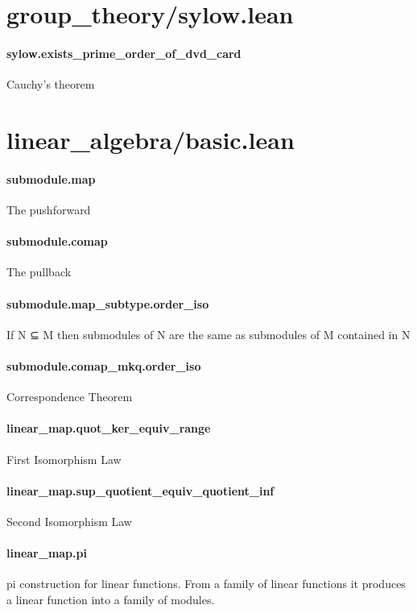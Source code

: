 \documentclass{article}
\begin{document}
\section{group\_theory/sylow.lean}\paragraph{sylow.exists\_prime\_order\_of\_dvd\_card}
\par
Cauchy's theorem
\section{linear\_algebra/basic.lean}\paragraph{submodule.map}
\par
The pushforward
\paragraph{submodule.comap}
\par
The pullback
\paragraph{submodule.map\_subtype.order\_iso}
\par
If N ⊆ M then submodules of N are the same as submodules of M contained in N
\paragraph{submodule.comap\_mkq.order\_iso}
\par
Correspondence Theorem
\paragraph{linear\_map.quot\_ker\_equiv\_range}
\par
First Isomorphism Law
\paragraph{linear\_map.sup\_quotient\_equiv\_quotient\_inf}
\par
Second Isomorphism Law
\paragraph{linear\_map.pi}
\par
\colorbox[RGB]{253,246,227}{{{{\color[RGB]{101, 123, 131} pi }}}} construction for linear functions. From a family of linear functions it produces a linear
function into a family of modules.
\end{document}
